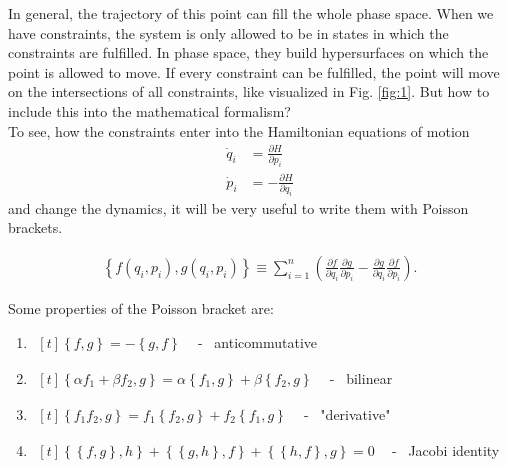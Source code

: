 In general, the trajectory of this point can fill the whole phase space. When we have constraints, the system is only allowed to be in states in which the constraints are fulfilled. In phase space, they build hypersurfaces on which the point is allowed to move. If every constraint can be fulfilled, the point will move on the intersections of all constraints, like visualized in Fig. \ref{fig:1}. But how to include this into the mathematical formalism? \\
To see, how the constraints enter into the Hamiltonian equations of motion
\begin{align}
\dot{q}_i &= \frac{\partial H}{\partial p_i} \label{eq:1} \\
\dot{p}_i &= - \frac{\partial H}{\partial q_i} \label{eq:2}
\end{align}
and change the dynamics, it will be very useful to write them with Poisson brackets.
\begin{definition}
\begin{align}
\left \{ f(q_i, p_i),g(q_i, p_i) \right \} \equiv \sum_{i=1}^n \left( \frac{\partial f}{\partial q_i} \frac{\partial g}{\partial p_i} - \frac{\partial g}{\partial q_i} \frac{\partial f}{\partial p_i} \right).
\end{align}
\end{definition}
Some properties of the Poisson bracket are:
\begin{enumerate}
\item \(
\begin{aligned}[t]
\left \{ f,g \right \} = - \left \{ g,f \right \}
\end{aligned} \) \ - \ anticommutative
\item \(
\begin{aligned}[t]
\left \{ \alpha f_1 + \beta f_2,g \right \} = \alpha \left \{ f_1,g \right \} + \beta \left \{ f_2,g \right \} 
\end{aligned} \) \ - \ bilinear
\item \(
\begin{aligned}[t]
\left \{  f_1 f_2,g \right \} = f_1 \left \{ f_2,g \right \} + f_2 \left \{ f_1,g \right \} 
\end{aligned} \) \ - \ "derivative"
\item \(
\begin{aligned}[t]
\left \{ \left \{ f,g \right \},h \right \} + \left \{ \left \{ g,h \right \},f \right \} + \left \{ \left \{ h,f \right \},g \right \} = 0 
\end{aligned} \) \ - \ Jacobi identity
\end{enumerate}
